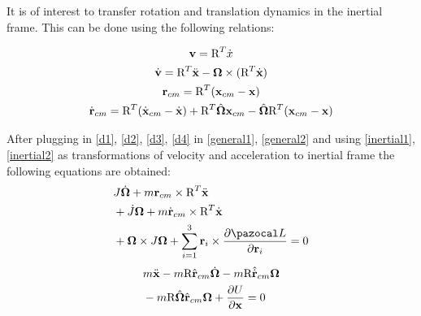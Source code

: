 It is of interest to transfer rotation and translation dynamics in the inertial frame. This can be done using the following relations:

\begin{gather}
	\textbf{v} = \text{R}^T \dot{x} \label{inertial1}\\
	\dot{\textbf{v}} = \text{R}^T \ddot{\textbf{x}} - \boldsymbol{\Omega} \times (\text{R}^T \dot{\textbf{x}} ) \label{inertial2} \\
	\textbf{r}_{cm} = \text{R}^T(\textbf{x}_{cm} - \textbf{x}) \label{inertial3} \\
	\dot{\textbf{r}}_{cm} = \text{R}^T(\dot{\textbf{x}}_{cm} - \dot{\textbf{x}}) + \text{R}^T\hat{\boldsymbol{\Omega}}\textbf{x}_{cm} - \hat{\boldsymbol{\Omega}}\text{R}^T(\textbf{x}_{cm} - \textbf{x}) \label{inertial4}
\end{gather}


After plugging in \ref{d1}, \ref{d2}, \ref{d3}, \ref{d4} in \ref{general1}, \ref{general2} and using \ref{inertial1}, \ref{inertial2} as transformations of velocity and acceleration to inertial frame the following equations are obtained:
\begin{align}
	\begin{split}
		& J\dot{\mb{\Omega}} + m \textbf{r}_{cm} \times \text{R}^T \ddot{\textbf{x}} \\
		&+ \dot{J} \mb{\Omega} + m\dot{\textbf{r}}_{cm} \times \text{R}^T \dot{\textbf{x}} \\
		&+ \mb{\Omega} \times J\mb{\Omega} + \sum_{i=1}^{3} \textbf{r}_i \times \frac{\partial \La}{\partial \textbf{r}_i} = 0
	\end{split}
\end{align}
\begin{align}
	\begin{split}
		& m\ddot{\textbf{x}} - m\text{R}\hat{\textbf{r}}_{cm} \dot{\boldsymbol{\Omega}} - m\text{R}\hat{\dot{\textbf{r}}}_{cm}\boldsymbol{\Omega}\\
		&-m\text{R}\hat{\boldsymbol{\Omega}}\hat{\textbf{r}}_{cm}\boldsymbol{\Omega} + \frac{\partial U}{\partial \textbf{x}} = 0
	\end{split}
\end{align}

